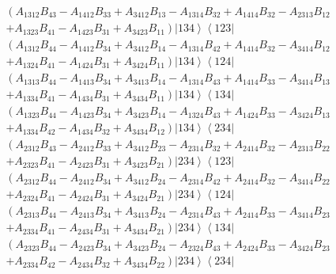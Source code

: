 \documentclass[aps,preprint]{revtex4}%
\begin{document}
\begin{align}
&  \left(  A_{1312}B_{43}-A_{1412}B_{33}+A_{3412}B_{13}-A_{1314}%
B_{32}+A_{1414}B_{32}-A_{2313}B_{12}\right. \nonumber\\
&  \left.  +A_{1323}B_{41}-A_{1423}B_{31}+A_{3423}B_{11}\right)  \left\vert
134\right\rangle \left\langle 123\right\vert \nonumber\\
&  \left(  A_{1312}B_{44}-A_{1412}B_{34}+A_{3412}B_{14}-A_{1314}%
B_{42}+A_{1414}B_{32}-A_{3414}B_{12}\right. \nonumber\\
&  \left.  +A_{1324}B_{41}-A_{1424}B_{31}+A_{3424}B_{11}\right)  \left\vert
134\right\rangle \left\langle 124\right\vert \nonumber\\
&  \left(  A_{1313}B_{44}-A_{1413}B_{34}+A_{3413}B_{14}-A_{1314}%
B_{43}+A_{1414}B_{33}-A_{3414}B_{13}\right. \nonumber\\
&  \left.  +A_{1334}B_{41}-A_{1434}B_{31}+A_{3434}B_{11}\right)  \left\vert
134\right\rangle \left\langle 134\right\vert \nonumber\\
&  \left(  A_{1323}B_{44}-A_{1423}B_{34}+A_{3423}B_{14}-A_{1324}%
B_{43}+A_{1424}B_{33}-A_{3424}B_{13}\right. \nonumber\\
&  \left.  +A_{1334}B_{42}-A_{1434}B_{32}+A_{3434}B_{12}\right)  \left\vert
134\right\rangle \left\langle 234\right\vert
\end{align}%
\begin{align}
&  \left(  A_{2312}B_{43}-A_{2412}B_{33}+A_{3412}B_{23}-A_{2314}%
B_{32}+A_{2414}B_{32}-A_{2313}B_{22}\right. \nonumber\\
&  \left.  +A_{2323}B_{41}-A_{2423}B_{31}+A_{3423}B_{21}\right)  \left\vert
234\right\rangle \left\langle 123\right\vert \nonumber\\
&  \left(  A_{2312}B_{44}-A_{2412}B_{34}+A_{3412}B_{24}-A_{2314}%
B_{42}+A_{2414}B_{32}-A_{3414}B_{22}\right. \nonumber\\
&  \left.  +A_{2324}B_{41}-A_{2424}B_{31}+A_{3424}B_{21}\right)  \left\vert
234\right\rangle \left\langle 124\right\vert \nonumber\\
&  \left(  A_{2313}B_{44}-A_{2413}B_{34}+A_{3413}B_{24}-A_{2314}%
B_{43}+A_{2414}B_{33}-A_{3414}B_{23}\right. \nonumber\\
&  \left.  +A_{2334}B_{41}-A_{2434}B_{31}+A_{3434}B_{21}\right)  \left\vert
234\right\rangle \left\langle 134\right\vert \nonumber\\
&  \left(  A_{2323}B_{44}-A_{2423}B_{34}+A_{3423}B_{24}-A_{2324}%
B_{43}+A_{2424}B_{33}-A_{3424}B_{23}\right. \nonumber\\
&  \left.  +A_{2334}B_{42}-A_{2434}B_{32}+A_{3434}B_{22}\right)  \left\vert
234\right\rangle \left\langle 234\right\vert
\end{align}
\end{document}

